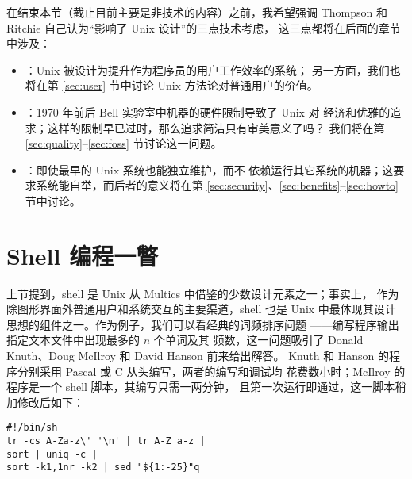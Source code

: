 在结束本节（截止目前主要是非技术的内容）之前，我希望强调 Thompson 和
Ritchie 自己认为“影响了 Unix 设计”的三点技术考虑，
这三点都将在后面的章节中涉及：
\begin{itemize}
\item {}：Unix 被设计为提升作为程序员的用户工作效率的系统；
	另一方面，我们也将在第 \ref{sec:user} 节中讨论 Unix 方法论对普通用户的价值。
\item {}：1970 年前后 Bell 实验室中机器的硬件限制导致了 Unix 对
	经济和优雅的追求；这样的限制早已过时，那么追求简洁只有审美意义了吗？
	我们将在第 \ref{sec:quality}--\ref{sec:foss} 节讨论这一问题。
\item {}：即使最早的 Unix 系统也能独立维护，而不
	依赖运行其它系统的机器；这要求系统能自举，而后者的意义将在第
	\ref{sec:security}、\ref{sec:benefits}--\ref{sec:howto} 节中讨论。
\end{itemize}

\section{Shell 编程一瞥}\label{sec:shell}

上节提到，shell 是 Unix 从 Multics 中借鉴的少数设计元素之一；事实上，
作为除图形界面外普通用户和系统交互的主要渠道，shell
也是 Unix 中最体现其设计思想的组件之一。作为例子，我们可以看经典的词频排序问题%
——编写程序输出指定文本文件中出现最多的 $n$ 个单词及其
频数，这一问题吸引了 Donald Knuth、Doug McIlroy 和 David Hanson 前来给出解答。
Knuth 和 Hanson 的程序分别采用 Pascal 或 C 从头编写，两者的编写和调试均
花费数小时；McIlroy 的程序是一个 shell 脚本，其编写只需一两分钟，
且第一次运行即通过，这一脚本稍加修改后如下：
\begin{quoting}
\begin{Verbatim}
#!/bin/sh
tr -cs A-Za-z\' '\n' | tr A-Z a-z |
sort | uniq -c |
sort -k1,1nr -k2 | sed "${1:-25}"q
\end{Verbatim}
\end{quoting}

